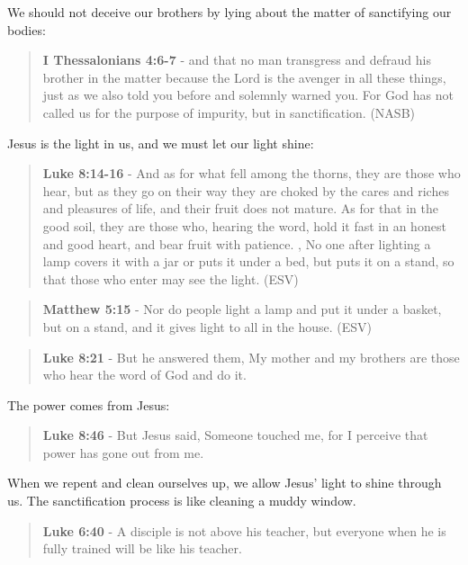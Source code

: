\documentclass[11pt]{article}
\begin{document}
We should not deceive our brothers by lying about the matter of sanctifying our bodies:

\begin{quote}
\textbf{I Thessalonians 4:6-7} - and that no man transgress and defraud his brother in the matter because the Lord is the avenger in all these things, just as we also told you before and solemnly warned you. For God has not called us for the purpose of impurity, but in sanctification. (NASB)
\end{quote}

Jesus is the light in us, and we must let our light shine:

\begin{quote}
\textbf{Luke 8:14-16} - And as for what fell among the thorns, they are those who hear, but as they go on their way they are choked by the cares and riches and pleasures of life, and their fruit does not mature. As for that in the good soil, they are those who, hearing the word, hold it fast in an honest and good heart, and bear fruit with patience. , No one after lighting a lamp covers it with a jar or puts it under a bed, but puts it on a stand, so that those who enter may see the light. (ESV)
\end{quote}

\begin{quote}
\textbf{Matthew 5:15} - Nor do people light a lamp and put it under a basket, but on a stand, and it gives light to all in the house. (ESV)
\end{quote}

\begin{quote}
\textbf{Luke 8:21} - But he answered them, My mother and my brothers are those who hear the word of God and do it.
\end{quote}

The power comes from Jesus:

\begin{quote}
\textbf{Luke 8:46} - But Jesus said, Someone touched me, for I perceive that power has gone out from me.
\end{quote}

When we repent and clean ourselves up, we allow Jesus' light to shine through us. The sanctification process is like cleaning a muddy window.

\begin{quote}
\textbf{Luke 6:40} - A disciple is not above his teacher, but everyone when he is fully trained will be like his teacher.
\end{quote}
\end{document}

